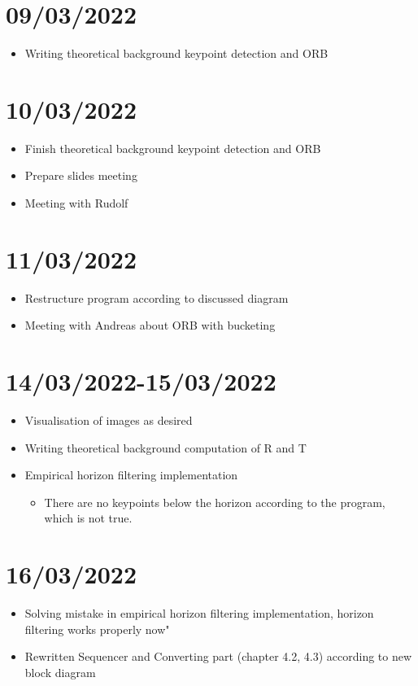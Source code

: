 \section{09/03/2022}
\begin{itemize}
    \item Writing theoretical background keypoint detection and ORB
\end{itemize}

\section{10/03/2022}
\begin{itemize}
    \item Finish theoretical background keypoint detection and ORB
    \item Prepare slides meeting
    \item Meeting with Rudolf
\end{itemize}

\section{11/03/2022}
\begin{itemize}
    \item Restructure program according to discussed diagram
    \item Meeting with Andreas about ORB with bucketing
\end{itemize}

\section{14/03/2022-15/03/2022}
\begin{itemize}
    \item Visualisation of images as desired
    \item Writing theoretical background computation of R and T
    \item Empirical horizon filtering implementation
    \begin{itemize}
        \item There are no keypoints below the horizon according to the program, which is not true.
    \end{itemize}
\end{itemize}

\section{16/03/2022}
\begin{itemize}
    \item Solving mistake in empirical horizon filtering implementation, horizon filtering works properly now"
    \item Rewritten Sequencer and Converting part (chapter 4.2, 4.3) according to new block diagram
\end{itemize}